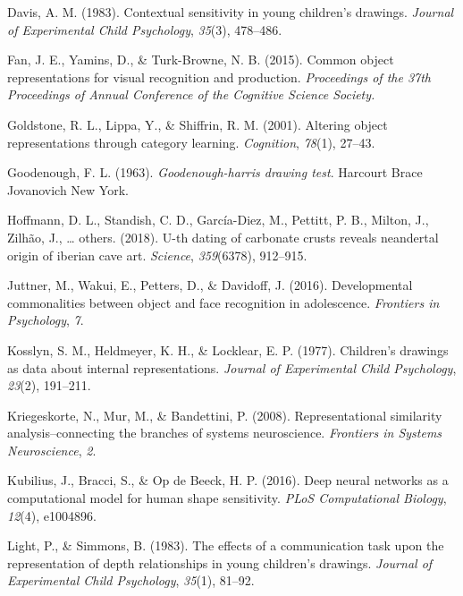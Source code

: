 \documentclass[10pt, letterpaper]{article}
\begin{document}
\hypertarget{refs}{}
\hypertarget{ref-davis1983contextual}{}
Davis, A. M. (1983). Contextual sensitivity in young children's
drawings. \emph{Journal of Experimental Child Psychology}, \emph{35}(3),
478--486.

\hypertarget{ref-fan2015common}{}
Fan, J. E., Yamins, D., \& Turk-Browne, N. B. (2015). Common object
representations for visual recognition and production. \emph{Proceedings
of the 37th Proceedings of Annual Conference of the Cognitive Science
Society.}

\hypertarget{ref-goldstone2001altering}{}
Goldstone, R. L., Lippa, Y., \& Shiffrin, R. M. (2001). Altering object
representations through category learning. \emph{Cognition},
\emph{78}(1), 27--43.

\hypertarget{ref-goodenough1963goodenough}{}
Goodenough, F. L. (1963). \emph{Goodenough-harris drawing test}.
Harcourt Brace Jovanovich New York.

\hypertarget{ref-hoffmann2018u}{}
Hoffmann, D. L., Standish, C. D., García-Diez, M., Pettitt, P. B.,
Milton, J., Zilhão, J., \ldots{} others. (2018). U-th dating of
carbonate crusts reveals neandertal origin of iberian cave art.
\emph{Science}, \emph{359}(6378), 912--915.

\hypertarget{ref-juttner2016developmental}{}
Juttner, M., Wakui, E., Petters, D., \& Davidoff, J. (2016).
Developmental commonalities between object and face recognition in
adolescence. \emph{Frontiers in Psychology}, \emph{7}.

\hypertarget{ref-kosslyn1977children}{}
Kosslyn, S. M., Heldmeyer, K. H., \& Locklear, E. P. (1977). Children's
drawings as data about internal representations. \emph{Journal of
Experimental Child Psychology}, \emph{23}(2), 191--211.

\hypertarget{ref-kriegeskorte2008RSA}{}
Kriegeskorte, N., Mur, M., \& Bandettini, P. (2008). Representational
similarity analysis--connecting the branches of systems neuroscience.
\emph{Frontiers in Systems Neuroscience}, \emph{2}.

\hypertarget{ref-kubilius2016deep}{}
Kubilius, J., Bracci, S., \& Op de Beeck, H. P. (2016). Deep neural
networks as a computational model for human shape sensitivity.
\emph{PLoS Computational Biology}, \emph{12}(4), e1004896.

\hypertarget{ref-light1983effects}{}
Light, P., \& Simmons, B. (1983). The effects of a communication task
upon the representation of depth relationships in young children's
drawings. \emph{Journal of Experimental Child Psychology}, \emph{35}(1),
81--92.
\end{document}
